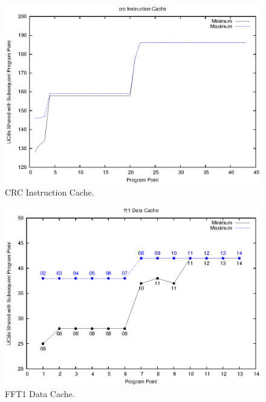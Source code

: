 \begin{figure}[h!]
\begin{center}
\includegraphics[width=\linewidth]{eps/crc-icache.eps}
\caption{CRC Instruction Cache.}
\label{fig:crc_instruction_cache}
\end{center}
\end{figure}
%
\vspace{-20pt}
\begin{figure}[h!]
\begin{center}
\includegraphics[width=\linewidth]{eps/fft1-dcache.eps}
\caption{FFT1 Data Cache.}
\label{fig:fft1_data_cache}
\end{center}
\end{figure}
%
\vspace{-20pt}
